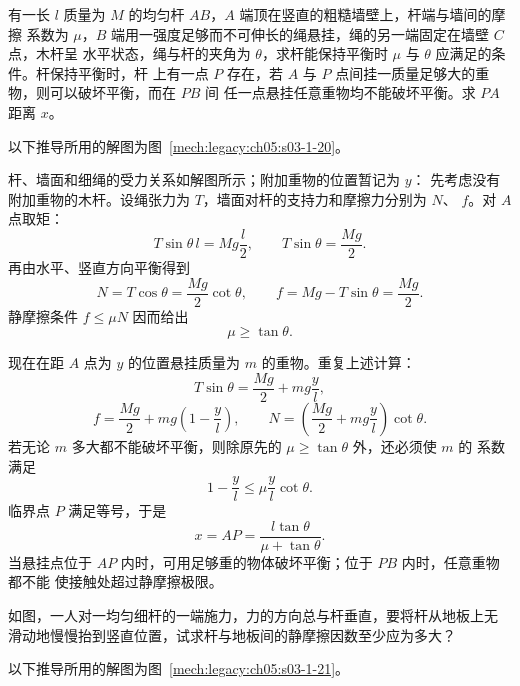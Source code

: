 {\begin{origexamplebox}{}\label{ch05:ex:s03-1-20}
有一长 $l$ 质量为 $M$ 的均匀杆 $AB$，$A$ 端顶在竖直的粗糙墙壁上，杆端与墙间的摩擦
系数为 $\mu$，$B$ 端用一强度足够而不可伸长的绳悬挂，绳的另一端固定在墙壁 $C$ 点，木杆呈
水平状态，绳与杆的夹角为 $\theta$，求杆能保持平衡时 $\mu$ 与 $\theta$ 应满足的条件。杆保持平衡时，杆
上有一点 $P$ 存在，若 $A$ 与 $P$ 点间挂一质量足够大的重物，则可以破坏平衡，而在 $PB$ 间
任一点悬挂任意重物均不能破坏平衡。求 $PA$ 距离 $x$。
\end{origexamplebox}

\begin{xesolution}
以下推导所用的解图为图~\ref{mech:legacy:ch05:s03-1-20}。

杆、墙面和细绳的受力关系如解图所示；附加重物的位置暂记为 $y$：
\soldiagOneTwenty
先考虑没有附加重物的木杆。设绳张力为 $T$，墙面对杆的支持力和摩擦力分别为 $N$、
$f$。对 $A$ 点取矩：
\[
  T\sin\theta\,l=Mg\frac l2,
  \qquad
  T\sin\theta=\frac{Mg}{2}.
\]
再由水平、竖直方向平衡得到
\[
  N=T\cos\theta=\frac{Mg}{2}\cot\theta,
  \qquad
  f=Mg-T\sin\theta=\frac{Mg}{2}.
\]
静摩擦条件 $f\le\mu N$ 因而给出
\[
  \boxed{\mu\ge\tan\theta}.
\]

现在在距 $A$ 点为 $y$ 的位置悬挂质量为 $m$ 的重物。重复上述计算：
\[
  T\sin\theta=\frac{Mg}{2}+mg\frac yl,
\]
\[
  f=\frac{Mg}{2}+mg\left(1-\frac yl\right),
  \qquad
  N=\left(\frac{Mg}{2}+mg\frac yl\right)\cot\theta.
\]
若无论 $m$ 多大都不能破坏平衡，则除原先的 $\mu\ge\tan\theta$ 外，还必须使 $m$ 的
系数满足
\[
  1-\frac yl\le\mu\frac yl\cot\theta.
\]
临界点 $P$ 满足等号，于是
\[
  \boxed{x=AP=\frac{l\tan\theta}{\mu+\tan\theta}}.
\]
当悬挂点位于 $AP$ 内时，可用足够重的物体破坏平衡；位于 $PB$ 内时，任意重物都不能
使接触处超过静摩擦极限。
\end{xesolution}

\begin{origexamplebox}{}\label{ch05:ex:s03-1-21}
如图，一人对一均匀细杆的一端施力，力的方向总与杆垂直，要将杆从地板上无
滑动地慢慢抬到竖直位置，试求杆与地板间的静摩擦因数至少应为多大？
\end{origexamplebox}

\begin{xesolution}
以下推导所用的解图为图~\ref{mech:legacy:ch05:s03-1-21}。


\end{xesolution}}
